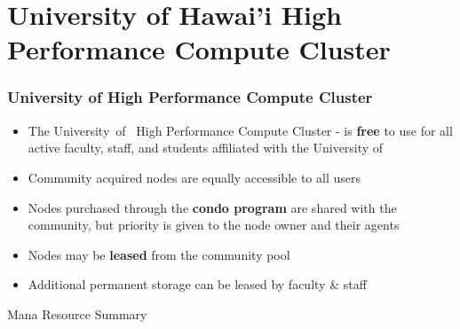 \section[University of Hawai'i High Performance Compute Cluster]{University of Hawai'i High Performance Compute Cluster}
\begin{frame}
    \frametitle{University of {\hawaii} High Performance Compute Cluster}
    \begin{itemize}
    \item The University~of~{\hawaii} High Performance Compute Cluster - \textbf{\mana} is \textbf{free} to use for all active faculty, staff, and students affiliated with the University of {\hawaii}
    \item Community acquired nodes are equally accessible to all users
    \item Nodes purchased through the {\textbf{condo program}} are shared with the community, but priority is given to the node owner and their agents
		\item Nodes may be {\textbf{leased}} from the community pool
		\item Additional permanent storage can be leased by faculty \& staff
    \end{itemize}
		\begin{block}{Mana Resource Summary}
  \begin{table}
    \centering
  \end{table}
	\end{block}
\end{frame}



